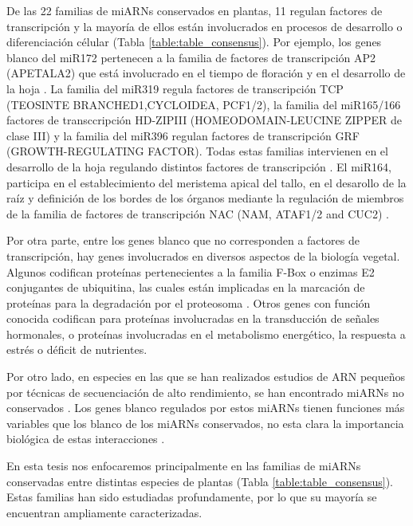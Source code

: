 De las 22 familias de miARNs conservados en plantas, 11 regulan factores de transcripción y la mayoría de ellos están involucrados en procesos de desarrollo o diferenciación célular \citep{Jones-Rhoades2006} (Tabla \ref{table:table_consensus}).
Por ejemplo, los genes blanco del miR172 pertenecen a la familia de factores de transcripción AP2 (APETALA2) que está involucrado en el tiempo de floración y en el desarrollo de la hoja \citep{pmid14555699, pmid12893888}.
La familia del miR319 regula factores de transcripción TCP (TEOSINTE BRANCHED1,CYCLOIDEA, PCF1/2), la familia del miR165/166 factores de transccripción HD-ZIPIII (HOMEODOMAIN-LEUCINE ZIPPER de clase III) y la familia del miR396 regulan factores de transcripción GRF (GROWTH-REGULATING FACTOR).
Todas estas familias intervienen en el desarrollo de la hoja regulando distintos factores de transcripción \citep{pmid12931144, pmid15351964, Rodriguez2010}.
El miR164, participa en el establecimiento del meristema apical del tallo, en el desarollo de la raíz y definición de los bordes de los órganos mediante la regulación de miembros de la familia de factores de transcripción NAC (NAM, ATAF1/2 and CUC2) \citep{laufus}.

Por otra parte, entre los genes blanco que no corresponden a factores de transcripción, hay genes involucrados en diversos aspectos de la biología vegetal.
Algunos codifican proteínas pertenecientes a la familia F-Box o enzimas E2 conjugantes de ubiquitina, las cuales están implicadas en la marcación de proteínas para la degradación por el proteosoma \citep{pmid19699140}.
Otros genes con función conocida codifican para proteínas involucradas en la transducción de señales hormonales, o proteínas involucradas en el metabolismo energético, la respuesta a estrés o déficit de nutrientes.

Por otro lado, en especies en las que se han realizados estudios de ARN pequeños por técnicas de secuenciación de alto rendimiento, se han encontrado miARNs no conservados \citep{citeulike:8816489, Rodriguez2010, Rajagopalan2006}.
Los genes blanco regulados por estos miARNs tienen funciones más variables que los blanco de los miARNs conservados, no esta clara la importancia biológica de estas interacciones \citep{citeulike:8816489}.

En esta tesis nos enfocaremos principalmente en las familias de miARNs conservadas entre distintas especies de plantas (Tabla \ref{table:table_consensus}).
Estas familias han sido estudiadas profundamente, por lo que su mayoría se encuentran ampliamente caracterizadas.


